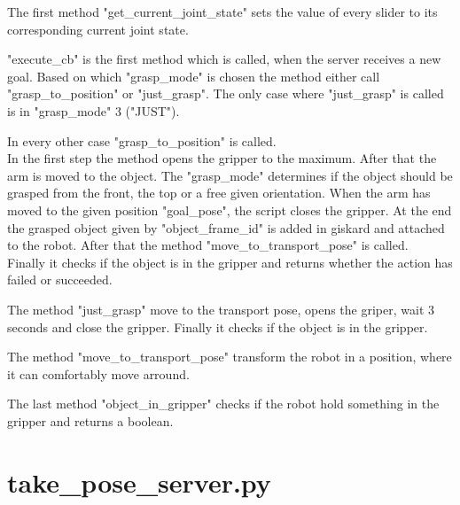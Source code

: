 \documentclass[main.tex]{subfiles}
\begin{document}
			 \vspace{0,75 cm}
			 The first method "get\_current\_joint\_state"  sets the value of every slider to its corresponding current joint state.
			 
			 \vspace{0,25 cm}
			 "execute\_cb" is the first method which is called, when the server receives a new goal. Based on which "grasp\_mode" is chosen the method either call "grasp\_to\_position" or "just\_grasp". The only case where "just\_grasp" is called is in "grasp\_mode" 3 ("JUST").
			 
			 \vspace{0,25 cm}
			 In every other case "grasp\_to\_position" is called.\\
			In the first step the method opens the gripper to the maximum. After that the arm is moved to the object. The "grasp\_mode" determines if the object should be grasped from the front, the top or a free given orientation. When the arm has moved to the given position "goal\_pose", the script closes the gripper. At the end the grasped object given by "object\_frame\_id" is added in giskard and attached to the robot. After that the method "move\_to\_transport\_pose" is called.\\
			Finally it checks if the object is in the gripper and returns whether the action has failed or succeeded.
			
			\vspace{0,25 cm}
			The method "just\_grasp" move to the transport pose, opens the griper, wait 3 seconds and close the gripper. Finally it checks if the object is in the gripper.
			
			\vspace{0,25 cm}
			The method "move\_to\_transport\_pose" transform the robot in a position, where it can comfortably move arround.
			
			\vspace{0,25 cm}
			The last method "object\_in\_gripper" checks if the robot hold something in the gripper and returns a boolean.\\
			
			\section{take\_pose\_server.py} 
			
\end{document}
